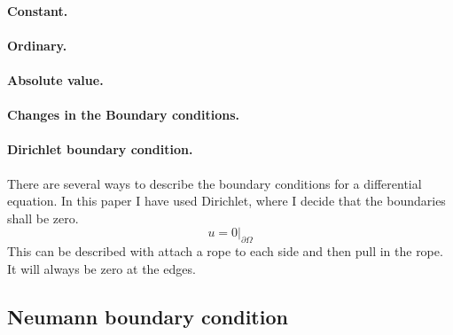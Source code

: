\documentclass{article}
\begin{document}
\paragraph{Constant.}

\paragraph{Ordinary.}

\paragraph{Absolute value.}

\paragraph{Changes in the Boundary conditions.}

\paragraph{Dirichlet boundary condition.}
There are several ways to describe the boundary conditions for a differential equation.
In this paper I have used Dirichlet, where I decide that the boundaries shall be zero.
\begin{equation}
u = 0|_{\partial \Omega}
\end{equation}
This can be described with attach a rope to each side and then pull in the rope. It will always
be zero at the edges.

\subsection{Neumann boundary condition}
\end{document}
